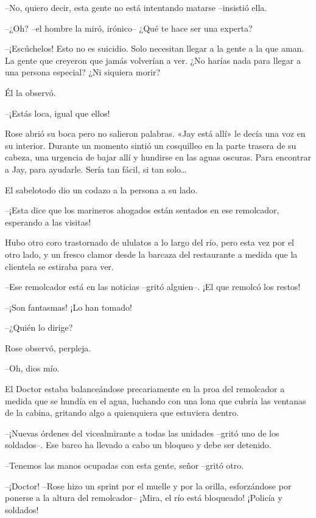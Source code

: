 {--No, quiero decir, esta gente no está intentando matarse --insistió
ella.}

{--¿Oh? --el hombre la miró, irónico-- ¿Qué te hace ser una experta?}

{--¡Escúchelos! Esto no es suicidio. Solo necesitan llegar a la gente a
 la que aman. La gente que creyeron que jamás volverían a ver. ¿No harías
nada para llegar a una persona especial? ¿Ni siquiera morir?}

{Él la observó.}

{--¡Estás loca, igual que ellos!}

{Rose abrió su boca pero no salieron palabras. «Jay está allí» le decía
 una voz en su interior. Durante un momento sintió un cosquilleo en la
 parte trasera de su cabeza, una urgencia de bajar allí y hundirse en las
 aguas oscuras. Para encontrar a Jay, para ayudarle. Sería tan fácil, si
 tan solo\ldots{}}

{El sabelotodo dio un codazo a la persona a su lado.}

{--¡Esta dice que los marineros ahogados están sentados en ese
remolcador, esperando a las visitas!}

{Hubo otro coro trastornado de ululatos a lo largo del río, pero esta
 vez por el otro lado, y un fresco clamor desde la barcaza del
restaurante a medida que la clientela se estiraba para ver.}

{--Ese remolcador está en las noticias --gritó alguien--. ¡El que
remolcó los restos!}

{--¡Son fantasmas! ¡Lo han tomado!}

{--¿Quién lo dirige?}

{Rose observó, perpleja.}

{--Oh, dios mío.}

{El Doctor estaba balanceándose precariamente en la proa del remolcador
 a medida que se hundía en el agua, luchando con una lona que cubría las
 ventanas de la cabina, gritando algo a quienquiera que estuviera
dentro.}

{--¡Nuevas órdenes del vicealmirante a todas las unidades --gritó uno de
 los soldados--. Ese barco ha llevado a cabo un bloqueo y debe ser
detenido.}

{--Tenemos las manos ocupadas con esta gente, señor --gritó otro.}

{--¡Doctor! --Rose hizo un sprint por el muelle y por la orilla,
 esforzándose por ponerse a la altura del remolcador-- ¡Mira, el río está
bloqueado! ¡Policía y soldados!}

